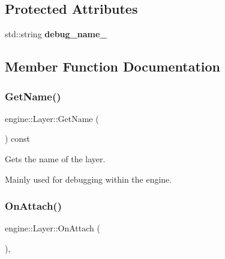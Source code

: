 \subsection*{Protected Attributes}
\begin{DoxyCompactItemize}
\item 
\mbox{\label{classengine_1_1Layer_a9283719bf3b3d956809ef351a43ee16f}} 
std\+::string {\bfseries debug\+\_\+name\+\_\+}
\end{DoxyCompactItemize}


\subsection{Member Function Documentation}
\mbox{\label{classengine_1_1Layer_a770a8fb58326ed32779e84bf54a93eef}} 
\subsubsection{\texorpdfstring{Get\+Name()}{GetName()}}
{\footnotesize\ttfamily engine\+::\+Layer\+::\+Get\+Name (\begin{DoxyParamCaption}{ }\end{DoxyParamCaption}) const\hspace{0.3cm}{\ttfamily [inline]}}



Gets the name of the layer. 

Mainly used for debugging within the engine. \mbox{\label{classengine_1_1Layer_ace68c1d4e441165d6741a74d4b11c7f0}} 
\subsubsection{\texorpdfstring{On\+Attach()}{OnAttach()}}
{\footnotesize\ttfamily engine\+::\+Layer\+::\+On\+Attach (\begin{DoxyParamCaption}{ }\end{DoxyParamCaption})\hspace{0.3cm}{\ttfamily [inline]}, {\ttfamily [virtual]}}



